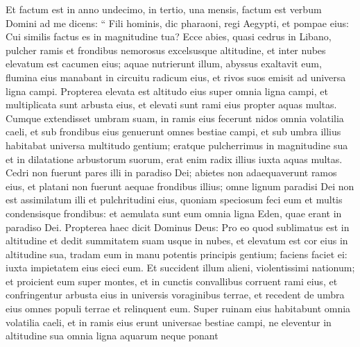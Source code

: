 \begin{biblechapter}
\begin{biblechapter}
\begin{biblechapter}
\begin{biblechapter}
\begin{biblechapter}
\begin{biblechapter}
\begin{biblechapter}
\begin{biblechapter}
\begin{biblechapter}
\begin{biblechapter}
\begin{biblechapter}
\begin{biblechapter}
\begin{biblechapter}
\begin{biblechapter}
\begin{biblechapter}
\begin{biblechapter}
\begin{biblechapter}
\begin{biblechapter}
\begin{biblechapter}
\begin{biblechapter}
\begin{biblechapter}
\begin{biblechapter}
\begin{biblechapter}
\begin{biblechapter}
\begin{biblechapter}
\begin{biblechapter}
\begin{biblechapter}
\begin{biblechapter}
\begin{biblechapter}
\begin{biblechapter}
\begin{biblechapter}
\verse Et factum est in anno undecimo, in tertio, una mensis, factum est verbum Domini ad me dicens: 
\verse“ Fili hominis, dic pharaoni, regi Aegypti, et pompae eius:
 Cui similis factus es in magnitudine tua?
 \verse Ecce abies, quasi cedrus in Libano,
 pulcher ramis et frondibus nemorosus
 excelsusque altitudine,
 et inter nubes elevatum est cacumen eius;
 \verse aquae nutrierunt illum,
 abyssus exaltavit eum,
 flumina eius manabant
 in circuitu radicum eius,
 et rivos suos emisit
 ad universa ligna campi.
 \verse Propterea elevata est altitudo eius
 super omnia ligna campi,
 et multiplicata sunt arbusta eius,
 et elevati sunt rami eius
 propter aquas multas.
 \verse Cumque extendisset umbram suam,
 in ramis eius fecerunt nidos
 omnia volatilia caeli,
 et sub frondibus eius genuerunt
 omnes bestiae campi,
 et sub umbra illius habitabat
 universa multitudo gentium;
 \verse eratque pulcherrimus in magnitudine sua
 et in dilatatione arbustorum suorum,
 erat enim radix illius
 iuxta aquas multas.
 \verse Cedri non fuerunt pares illi
 in paradiso Dei;
 abietes non adaequaverunt
 ramos eius,
 et platani non fuerunt
 aequae frondibus illius;
 omne lignum paradisi Dei
 non est assimilatum illi et pulchritudini eius,
 \verse quoniam speciosum feci eum
 et multis condensisque frondibus:
 et aemulata sunt eum omnia ligna Eden,
 quae erant in paradiso Dei.
 \verse Propterea haec dicit Dominus Deus: Pro eo quod sublimatus est in altitudine et dedit summitatem suam usque in nubes, et elevatum est cor eius in altitudine sua, 
\verse tradam eum in manu potentis principis gentium; faciens faciet ei: iuxta impietatem eius eieci eum. 
\verse Et succident illum alieni, violentissimi nationum; et proicient eum super montes, et in cunctis convallibus corruent rami eius, et confringentur arbusta eius in universis voraginibus terrae, et recedent de umbra eius omnes populi terrae et relinquent eum.
 \verse Super ruinam eius habitabunt
 omnia volatilia caeli,
 et in ramis eius erunt
 universae bestiae campi,
 \verse ne eleventur in altitudine sua
 omnia ligna aquarum neque ponant

\end{biblechapter}
\end{biblechapter}
\end{biblechapter}
\end{biblechapter}
\end{biblechapter}
\end{biblechapter}
\end{biblechapter}
\end{biblechapter}
\end{biblechapter}
\end{biblechapter}
\end{biblechapter}
\end{biblechapter}
\end{biblechapter}
\end{biblechapter}
\end{biblechapter}
\end{biblechapter}
\end{biblechapter}
\end{biblechapter}
\end{biblechapter}
\end{biblechapter}
\end{biblechapter}
\end{biblechapter}
\end{biblechapter}
\end{biblechapter}
\end{biblechapter}
\end{biblechapter}
\end{biblechapter}
\end{biblechapter}
\end{biblechapter}
\end{biblechapter}
\end{biblechapter}
